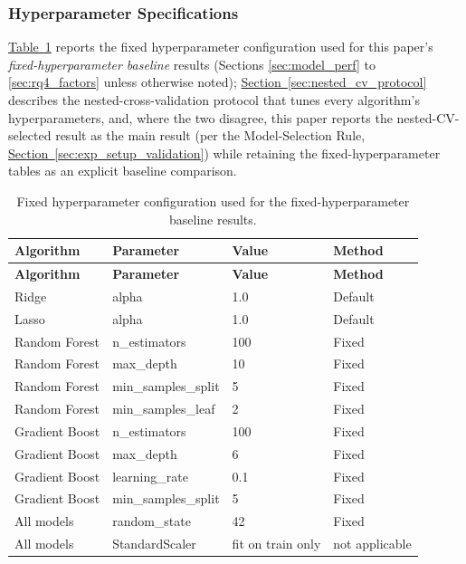\documentclass[technologies,article,submit,pdftex,moreauthors]{Definitions/mdpi}
\begin{document}
\subsubsection{Hyperparameter Specifications}\label{sec:hyperparams}

\hyperref[tab:hyperparams]{Table~\ref*{tab:hyperparams}} reports the fixed hyperparameter configuration used for this paper's \emph{fixed-hyperparameter baseline} results (Sections \hyperref[sec:model_perf]{\ref*{sec:model_perf}} to \hyperref[sec:rq4_factors]{\ref*{sec:rq4_factors}} unless otherwise noted); \hyperref[sec:nested_cv_protocol]{Section~\ref*{sec:nested_cv_protocol}} describes the nested-cross-validation protocol that tunes every algorithm's hyperparameters, and, where the two disagree, this paper reports the nested-CV-selected result as the main result (per the Model-Selection Rule, \hyperref[sec:exp_setup_validation]{Section~\ref*{sec:exp_setup_validation}}) while retaining the fixed-hyperparameter tables as an explicit baseline comparison.

\begin{longtable}[]{@{}llll@{}}
\caption{Fixed hyperparameter configuration used for the fixed-hyperparameter baseline results.\label{tab:hyperparams}}\\
\toprule\noalign{}
\textbf{Algorithm} & \textbf{Parameter} & \textbf{Value} & \textbf{Method} \\
\midrule\noalign{}
\endfirsthead
\toprule\noalign{}
\textbf{Algorithm} & \textbf{Parameter} & \textbf{Value} & \textbf{Method} \\
\midrule\noalign{}
\endhead
\bottomrule\noalign{}
\endlastfoot
Ridge & alpha & 1.0 & Default \\
Lasso & alpha & 1.0 & Default \\
Random Forest & n\_estimators & 100 & Fixed \\
Random Forest & max\_depth & 10 & Fixed \\
Random Forest & min\_samples\_split & 5 & Fixed \\
Random Forest & min\_samples\_leaf & 2 & Fixed \\
Gradient Boost & n\_estimators & 100 & Fixed \\
Gradient Boost & max\_depth & 6 & Fixed \\
Gradient Boost & learning\_rate & 0.1 & Fixed \\
Gradient Boost & min\_samples\_split & 5 & Fixed \\
All models & random\_state & 42 & Fixed \\
All models & StandardScaler & fit on train only & not applicable \\
\end{longtable}
\end{document}
